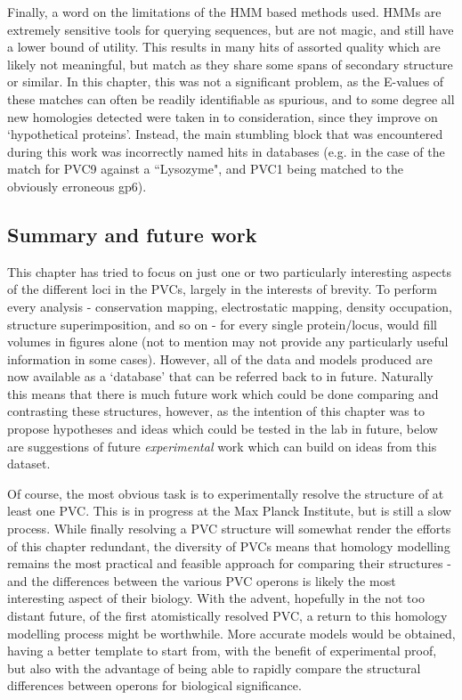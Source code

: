 Finally, a word on the limitations of the HMM based methods used. HMMs are extremely sensitive tools for querying sequences, but are not magic, and still have a lower bound of utility. This results in many hits of assorted quality which are likely not meaningful, but match as they share some spans of secondary structure or similar. In this chapter, this was not a significant problem, as the E-values of these matches can often be readily identifiable as spurious, and to some degree all new homologies detected were taken in to consideration, since they improve on `hypothetical proteins'. Instead, the main stumbling block that was encountered during this work was incorrectly named hits in databases (e.g. in the case of the match for PVC9 against a ``Lysozyme", and PVC1 being matched to the obviously erroneous gp6).

\subsection{Summary and future work}
This chapter has tried to focus on just one or two particularly interesting aspects of the different loci in the PVCs, largely in the interests of brevity. To perform every analysis - conservation mapping, electrostatic mapping, density occupation, structure superimposition, and so on - for every single protein/locus, would fill volumes in figures alone (not to mention may not provide any particularly useful information in some cases). However, all of the data and models produced are now available as a `database' that can be referred back to in future. Naturally this means that there is much future work which could be done comparing and contrasting these structures, however, as the intention of this chapter was to propose hypotheses and ideas which could be tested in the lab in future, below are suggestions of future \emph{experimental} work which can build on ideas from this dataset.

Of course, the most obvious task is to experimentally resolve the structure of at least one PVC. This is in progress at the Max Planck Institute, but is still a slow process. While finally resolving a PVC structure will somewhat render the efforts of this chapter redundant, the diversity of PVCs means that homology modelling remains the most practical and feasible approach for comparing their structures - and the differences between the various PVC operons is likely the most interesting aspect of their biology. With the advent, hopefully in the not too distant future, of the first atomistically resolved PVC, a return to this homology modelling process might be worthwhile. More accurate models would be obtained, having a better template to start from, with the benefit of experimental proof, but also with the advantage of being able to rapidly compare the structural differences between operons for biological significance.

